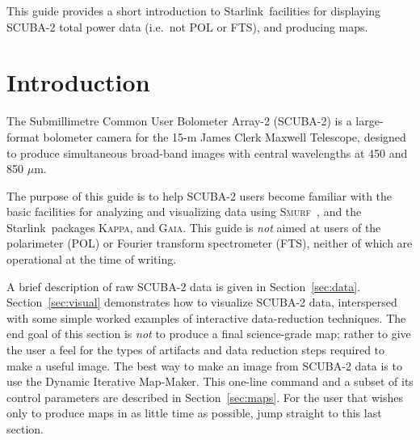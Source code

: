 \documentclass[twoside,11pt]{article}
\newcommand{\micron}{\mbox{\,${\mu}$m}}            %
\newcommand{\stardocinitials}  {SC}
\newcommand{\stardocnumber}    {19.01}
\newcommand{\stardocabstract}  {

  This guide provides a short introduction to \starlink\ facilities
  for displaying SCUBA-2 total power data (i.e.~not POL or FTS), and
  producing maps.

}
\newcommand{\starlink}{\htmladdnormallink{Starlink}{http://starlink.jach.hawaii.edu}}
\newcommand{\Kappa}{\xref{\textsc{Kappa}}{sun95}{}}
\newcommand{\gaia}{\xref{\textsc{Gaia}}{sun214}{}}
\newcommand{\smurf}{\xref{\textsc{Smurf}}{sun258}{}}
\newcommand{\stardocname}{\stardocinitials /\stardocnumber}
\newcommand{\htmladdnormallink}[2]{#1}
\newenvironment{latexonly}{}{}
\newcommand{\xref}[3]{#1}
\newcommand{\xlabel}[1]{}
\renewcommand{\_}{\texttt{\symbol{95}}}
\renewcommand{\thepage}{\roman{page}}
\begin{document}
\begin{htmlonly}
\end{htmlonly}



\stardocabstract


  \newpage
  \begin{latexonly}
    \setlength{\parskip}{0mm}
    \tableofcontents
    \setlength{\parskip}{\medskipamount}
    \markboth{\stardocname}{\stardocname}
  \end{latexonly}


\cleardoublepage
\renewcommand{\thepage}{\arabic{page}}
\setcounter{page}{1}


\section{\xlabel{introduction}Introduction}

The Submillimetre Common User Bolometer Array-2 (SCUBA-2) is a
large-format bolometer camera for the 15-m James Clerk Maxwell
Telescope, designed to produce simultaneous broad-band images with
central wavelengths at 450 and 850\,\micron.

The purpose of this guide is to help SCUBA-2 users become familiar
with the basic facilities for analyzing and visualizing data using
\smurf\ \cite{smurf}, and the \starlink\ packages \Kappa \cite{kappa},
and \gaia \cite{gaia}.  This guide is {\em not} aimed at users of the
polarimeter (POL) or Fourier transform spectrometer (FTS), neither of
which are operational at the time of writing.

A brief description of raw SCUBA-2 data is given in
Section~\ref{sec:data}. Section~\ref{sec:visual} demonstrates how to
visualize SCUBA-2 data, interspersed with some simple worked examples
of interactive data-reduction techniques. The end goal of this section
is {\em not} to produce a final science-grade map; rather to give the
user a feel for the types of artifacts and data reduction steps
required to make a useful image. The best way to make an image from
SCUBA-2 data is to use the Dynamic Iterative Map-Maker. This one-line
command and a subset of its control parameters are described in
Section~\ref{sec:maps}. For the user that wishes only to produce maps
in as little time as possible, jump straight to this last section.
\end{document}
